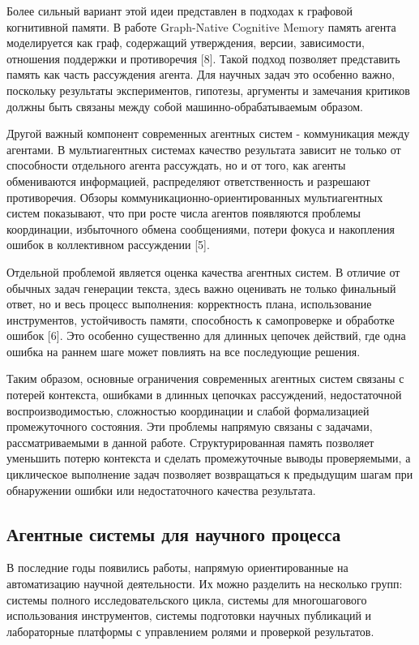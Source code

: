Более сильный вариант этой идеи представлен в подходах к графовой когнитивной памяти. В работе Graph-Native Cognitive Memory память агента моделируется как граф, содержащий утверждения, версии, зависимости, отношения поддержки и противоречия [8]. Такой подход позволяет представить память как часть рассуждения агента. Для научных задач это особенно важно, поскольку результаты экспериментов, гипотезы, аргументы и замечания критиков должны быть связаны между собой машинно-обрабатываемым образом.

Другой важный компонент современных агентных систем - коммуникация между агентами. В мультиагентных системах качество результата зависит не только от способности отдельного агента рассуждать, но и от того, как агенты обмениваются информацией, распределяют ответственность и разрешают противоречия. Обзоры коммуникационно-ориентированных мультиагентных систем показывают, что при росте числа агентов появляются проблемы координации, избыточного обмена сообщениями, потери фокуса и накопления ошибок в коллективном рассуждении [5].

Отдельной проблемой является оценка качества агентных систем. В отличие от обычных задач генерации текста, здесь важно оценивать не только финальный ответ, но и весь процесс выполнения: корректность плана, использование инструментов, устойчивость памяти, способность к самопроверке и обработке ошибок [6]. Это особенно существенно для длинных цепочек действий, где одна ошибка на раннем шаге может повлиять на все последующие решения.

Таким образом, основные ограничения современных агентных систем связаны с потерей контекста, ошибками в длинных цепочках рассуждений, недостаточной воспроизводимостью, сложностью координации и слабой формализацией промежуточного состояния. Эти проблемы напрямую связаны с задачами, рассматриваемыми в данной работе. Структурированная память позволяет уменьшить потерю контекста и сделать промежуточные выводы проверяемыми, а циклическое выполнение задач позволяет возвращаться к предыдущим шагам при обнаружении ошибки или недостаточного качества результата.

\subsection{Агентные системы для научного процесса}

В последние годы появились работы, напрямую ориентированные на автоматизацию научной деятельности. Их можно разделить на несколько групп: системы полного исследовательского цикла, системы для многошагового использования инструментов, системы подготовки научных публикаций и лабораторные платформы с управлением ролями и проверкой результатов.

